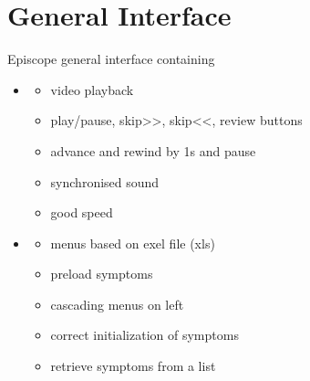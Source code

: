 \documentclass[letterpaper,10pt,english]{sphinxmanual}
\begin{document}
\chapter{General Interface}
\label{\detokenize{general_interface:module-general_interface_V10}}\label{\detokenize{general_interface:general-interface}}\label{\detokenize{general_interface::doc}}
\sphinxAtStartPar
Episcope general interface containing
\begin{itemize}
\item {} \begin{description}
\begin{itemize}
\item {} 
\sphinxAtStartPar
video playback

\item {} 
\sphinxAtStartPar
play/pause, skip\textgreater{}\textgreater{}, skip\textless{}\textless{}, review buttons

\item {} 
\sphinxAtStartPar
advance and rewind by 1s and pause

\item {} 
\sphinxAtStartPar
synchronised sound

\item {} 
\sphinxAtStartPar
good speed

\end{itemize}

\end{description}

\item {} \begin{description}
\begin{itemize}
\item {} 
\sphinxAtStartPar
menus based on exel file (xls)

\item {} 
\sphinxAtStartPar
pre\sphinxhyphen{}load symptoms

\item {} 
\sphinxAtStartPar
cascading menus on left

\item {} 
\sphinxAtStartPar
correct initialization of symptoms

\item {} 
\sphinxAtStartPar
retrieve symptoms from a list


\end{itemize}
\end{description}
\end{itemize}
\end{document}
